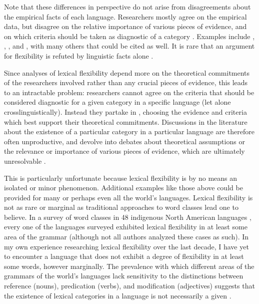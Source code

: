 Note that these differences in perspective do not arise from disagreements about the empirical facts of each language. Researchers mostly agree on the empirical data, but disagree on the relative importance of various pieces of evidence, and on which criteria should be taken as diagnostic of a category \parencites[235]{Wetzer1992}[32]{Stassen1997}[58]{CroftvanLier2012}. Examples include  \parencite{Chafe2012},  \parencites{EvansOsada2005}{HengeveldRijkhoff2005},  \parencites[17]{SchachterShopen2007}{Floyd2011}, and  \parencites[352]{Robins1968}[62--63]{Hardjadibrata1985}, with many others that could be cited as well. It is rare that an argument for flexibility is refuted by linguistic facts alone .

Since analyses of lexical flexibility depend more on the theoretical commitments of the researchers involved rather than any crucial pieces of evidence, this leads to an intractable problem: researchers cannot agree on the criteria that should be considered diagnostic for a given category in a specific language (let alone crosslinguistically). Instead they partake in  \parencite[30]{Croft2001}, choosing the evidence and criteria which best support their theoretical commitments. Discussions in the literature about the existence of a particular category in a particular language are therefore often unproductive, and devolve into debates about theoretical assumptions or the relevance or importance of various pieces of evidence, which are ultimately unresolvable \parencite[435]{Croft2005}.

This is particularly unfortunate because lexical flexibility is by no means an isolated or minor phenomenon. Additional examples like those above could be provided for many or perhaps even all the world's languages. Lexical flexibility is not as rare or marginal as traditional approaches to word classes lead one to believe. In a survey of word classes in 48 indigenous North American languages \parencite{Hieberforthcoming}, every one of the languages surveyed exhibited lexical flexibility in at least some area of the grammar (although not all authors analyzed these cases as such). In my own experience researching lexical flexibility over the last decade, I have yet to encounter a language that does not exhibit a degree of flexibility in at least some words, however marginally. The prevalence with which different areas of the grammars of the world's languages lack sensitivity to the distinctions between reference (nouns), predication (verbs), and modification (adjectives) suggests that the existence of lexical categories in a language is not necessarily a given \parencite{Hieberforthcoming}.

